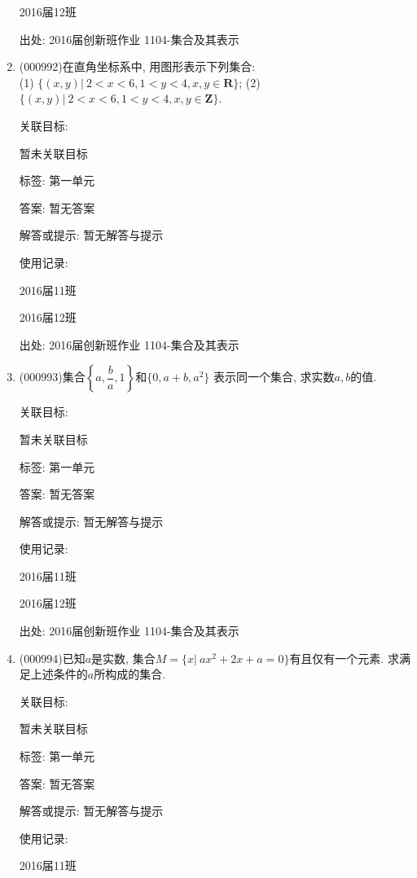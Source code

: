 \documentclass[10pt,a4paper]{article}
\begin{document}
\begin{enumerate}[1.]
2016届12班		


出处: 2016届创新班作业	1104-集合及其表示
\item { (000992)}在直角坐标系中, 用图形表示下列集合:\\ 
(1) $\{(x,y)|\ 2<x<6,1<y<4,x,y\in\mathbf{R}\}$; \hfill (2) $\{(x,y)|\ 2<x<6,1<y<4,x,y\in\mathbf{Z}\}$.


关联目标:

暂未关联目标



标签: 第一单元

答案: 暂无答案

解答或提示: 暂无解答与提示

使用记录:

2016届11班		

2016届12班		


出处: 2016届创新班作业	1104-集合及其表示
\item { (000993)}集合$\left\{a,\dfrac{b}{a},1\right\}$和$\{0,a+b,a^2\}$ 表示同一个集合, 求实数$a,b$的值.


关联目标:

暂未关联目标



标签: 第一单元

答案: 暂无答案

解答或提示: 暂无解答与提示

使用记录:

2016届11班	

2016届12班	


出处: 2016届创新班作业	1104-集合及其表示
\item { (000994)}已知$a$是实数, 集合$M=\{x|\ ax^2+2x+a=0\}$有且仅有一个元素. 求满足上述条件的$a$所构成的集合.


关联目标:

暂未关联目标



标签: 第一单元

答案: 暂无答案

解答或提示: 暂无解答与提示

使用记录:

2016届11班	


\end{enumerate}
\end{document}
